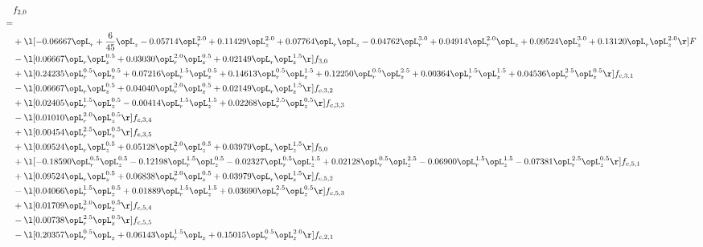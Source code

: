 \begin{alignat}{2} 
\label{eq:f_20_2} 
& f_{2,0} \nonumber \\ 
 = \\ 
& + \l[  -0.06667 \opL_r + \frac{6}{45} \opL_z   -0.05714 \opL_r^{2.0} +  0.11429 \opL_z^{2.0} +  0.07764 \opL_r \opL_z   -0.04762 \opL_r^{3.0} +  0.04914 \opL_r^{2.0} \opL_z +  0.09524 \opL_z^{3.0} +  0.13120 \opL_r \opL_z^{2.0}  \r] F \nonumber \\ 
& - \l[  0.06667 \opL_r \opL_z^{0.5} +  0.03030 \opL_r^{2.0} \opL_z^{0.5} +  0.02149 \opL_r \opL_z^{1.5}  \r] f_{3,0} \nonumber \\ 
& + \l[  0.24235 \opL_r^{0.5} \opL_z^{0.5} +  0.07216 \opL_r^{1.5} \opL_z^{0.5} +  0.14613 \opL_r^{0.5} \opL_z^{1.5} +  0.12250 \opL_r^{0.5} \opL_z^{2.5} +  0.00364 \opL_r^{1.5} \opL_z^{1.5} +  0.04536 \opL_r^{2.5} \opL_z^{0.5}  \r] f_{c,3,1} \nonumber \\ 
& - \l[  0.06667 \opL_r \opL_z^{0.5} +  0.04040 \opL_r^{2.0} \opL_z^{0.5} +  0.02149 \opL_r \opL_z^{1.5}  \r] f_{c,3,2} \nonumber \\ 
& + \l[  0.02405 \opL_r^{1.5} \opL_z^{0.5}   -0.00414 \opL_r^{1.5} \opL_z^{1.5} +  0.02268 \opL_r^{2.5} \opL_z^{0.5}  \r] f_{c,3,3} \nonumber \\ 
& - \l[  0.01010 \opL_r^{2.0} \opL_z^{0.5}  \r] f_{c,3,4} \nonumber \\ 
& + \l[  0.00454 \opL_r^{2.5} \opL_z^{0.5}  \r] f_{c,3,5} \nonumber \\ 
& + \l[  0.09524 \opL_r \opL_z^{0.5} +  0.05128 \opL_r^{2.0} \opL_z^{0.5} +  0.03979 \opL_r \opL_z^{1.5}  \r] f_{5,0} \nonumber \\ 
& + \l[  -0.18590 \opL_r^{0.5} \opL_z^{0.5}   -0.12198 \opL_r^{1.5} \opL_z^{0.5}   -0.02327 \opL_r^{0.5} \opL_z^{1.5} +  0.02128 \opL_r^{0.5} \opL_z^{2.5}   -0.06900 \opL_r^{1.5} \opL_z^{1.5}   -0.07381 \opL_r^{2.5} \opL_z^{0.5}  \r] f_{c,5,1} \nonumber \\ 
& + \l[  0.09524 \opL_r \opL_z^{0.5} +  0.06838 \opL_r^{2.0} \opL_z^{0.5} +  0.03979 \opL_r \opL_z^{1.5}  \r] f_{c,5,2} \nonumber \\ 
& - \l[  0.04066 \opL_r^{1.5} \opL_z^{0.5} +  0.01889 \opL_r^{1.5} \opL_z^{1.5} +  0.03690 \opL_r^{2.5} \opL_z^{0.5}  \r] f_{c,5,3} \nonumber \\ 
& + \l[  0.01709 \opL_r^{2.0} \opL_z^{0.5}  \r] f_{c,5,4} \nonumber \\ 
& - \l[  0.00738 \opL_r^{2.5} \opL_z^{0.5}  \r] f_{c,5,5} \nonumber \\ 
& - \l[  0.20357 \opL_r^{0.5} \opL_z +  0.06143 \opL_r^{1.5} \opL_z +  0.15015 \opL_r^{0.5} \opL_z^{2.0}  \r] f_{c,2,1} \nonumber \\ 

\end{alignat}
